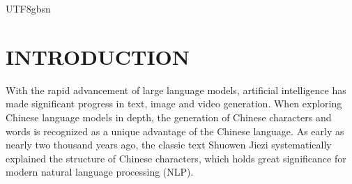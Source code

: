 \documentclass[conference]{IEEEtran}
\begin{document}
\begin{CJK*}{UTF8}{gbsn}



\section{INTRODUCTION}

With the rapid advancement of large language models, artificial intelligence has made significant progress in text, image and video generation. When exploring Chinese language models in depth, the generation of Chinese characters and words is recognized as a unique advantage of the Chinese language. As early as nearly two thousand years ago, the classic text Shuowen Jiezi systematically explained the structure of Chinese characters, which holds great significance for modern natural language processing (NLP).


\end{CJK*}
\end{document}
